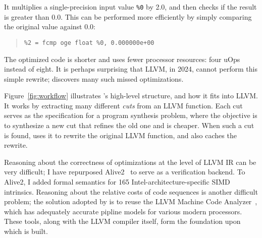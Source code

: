 It multiplies a single-precision input value \texttt{\%0} by 2.0, and
then checks if the result is greater than 0.0.
%
This can be performed more efficiently by simply comparing the
original value against 0.0:

{\begin{quote}
\begin{verbatim}
%2 = fcmp oge float %0, 0.000000e+00
\end{verbatim}
\end{quote}}

The optimized code is shorter and uses fewer processor resources: four
uOps instead of eight.
%
It is perhaps surprising that LLVM, in 2024, cannot perform this
simple rewrite; \minotaur{} discovers many such missed optimizations.



Figure~\ref{fig:workflow} illustrates \minotaur's high-level structure,
and how it fits into LLVM\@.
%
It works by extracting many different \textit{cuts} from an LLVM function.
%
Each cut serves as the specification for a program synthesis
problem, where the objective is to synthesize a new cut that refines
the old one and is cheaper.
%
When such a cut is found, \minotaur{} uses it to rewrite the original
LLVM function, and also caches the rewrite.


Reasoning about the correctness of optimizations at the level of LLVM
IR can be very difficult; I have repurposed Alive2~\cite{alive2} to
serve as a verification backend.
%
To Alive2, I added formal semantics for 165
Intel-architecture-specific SIMD intrinsics.
%
Reasoning about the relative costs of code sequences is another
difficult problem; the solution adopted by \minotaur{} is to reuse the
LLVM Machine Code Analyzer~\cite{llvmmca}, which has adequately
accurate pipline models for various modern processors.
%
These tools, along with the LLVM compiler itself, form the
foundation upon which \minotaur{} is built.


